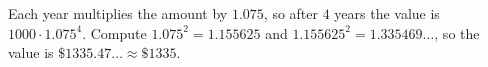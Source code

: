 Each year multiplies the amount by $1.075$, so after $4$ years the value is $1000\cdot1.075^4$. Compute $1.075^2=1.155625$ and $1.155625^2=1.335469\ldots$, so the value is $\$1335.47\ldots\approx\boxed{\$1335}$.
